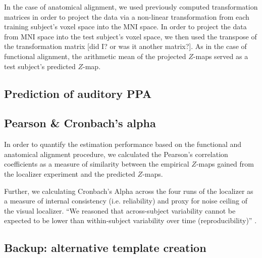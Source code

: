 
In the case of anatomical alignment, we used previously computed transformation
matrices
\citep[][\href{https://github.com/psychoinformatics-de/studyforrest-data-templatetransforms}{\url{github.com/psychoinformatics-de/studyforrest-data-templatetransforms}}]{hanke2014audiomovie}
in order to project the data via a non-linear transformation from each training
subject's voxel space into the MNI space.
In order to project the data from MNI space into the test subject's voxel space,
we then used the transpose of the transformation matrix [did I? or was it
another matrix?].
As in the case of functional alignment, the arithmetic mean of the projected
$Z$-maps served as a test subject's predicted $Z$-map.


\subsection{Prediction of auditory PPA}




\subsection{Pearson \& Cronbach's alpha}
In order to quantify the estimation performance based on the functional and
anatomical alignment procedure, we calculated the Pearson's correlation
coefficients as a measure of similarity between the empirical $Z$-maps gained
from the localizer experiment and the predicted $Z$-maps.

Further, we calculating Cronbach's Alpha across the four runs of the localizer
as a measure of internal consistency (i.e.  reliability) and proxy for noise
ceiling of the visual localizer.
%
``We reasoned that across-subject variability cannot be expected to be lower
than within-subject variability over time (reproducibility)''
\citep{rosenke2021probabilistic}.


\subsection{Backup: alternative template creation}

